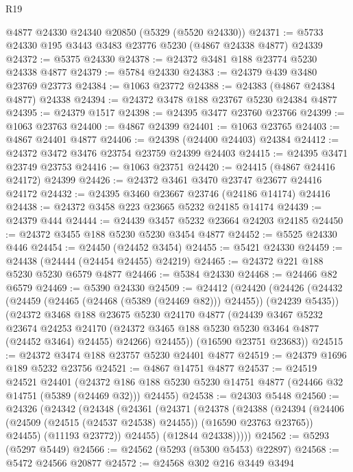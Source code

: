 \begin{lexlean}{R19}
\begin{coremodule}
    @4877
    @24330
    @24340
    @20850
    (@5329 (@5520 @24330))
@24371 := @5733 @24330 @195 @3443 @3483 @23776 @5230 (@4867 @24338 @4877) @24339
@24372 := @5375 @24330
@24378 := @24372 @3481 @188 @23774 @5230 @24338 @4877
@24379 := @5784 @24330
@24383 := @24379 @439 @3480 @23769 @23773
@24384 := @1063 @23772
@24388 := @24383 (@4867 @24384 @4877) @24338
@24394 := @24372 @3478 @188 @23767 @5230 @24384 @4877
@24395 := @24379 @1517
@24398 := @24395 @3477 @23760 @23766
@24399 := @1063 @23763
@24400 := @4867 @24399
@24401 := @1063 @23765
@24403 := @4867 @24401 @4877
@24406 := @24398 (@24400 @24403) @24384
@24412 := @24372 @3472 @3476 @23754 @23759 @24399 @24403
@24415 := @24395 @3471 @23749 @23753
@24416 := @1063 @23751
@24420 := @24415 (@4867 @24416 @24172) @24399
@24426 := @24372 @3461 @3470 @23747 @23677 @24416 @24172
@24432 := @24395 @3460 @23667 @23746 (@24186 @14174) @24416
@24438 := @24372 @3458 @223 @23665 @5232 @24185 @14174
@24439 := @24379 @444
@24444 := @24439 @3457 @5232 @23664 @24203 @24185
@24450 := @24372 @3455 @188 @5230 @5230 @3454 @4877
@24452 := @5525 @24330 @446
@24454 := @24450 (@24452 @3454)
@24455 := @5421 @24330
@24459 := @24438 (@24444 (@24454 @24455) @24219)
@24465 := @24372 @221 @188 @5230 @5230 @6579 @4877
@24466 := @5384 @24330
@24468 := @24466 @82 @6579
@24469 := @5390 @24330
@24509 := @24412
    (@24420
      (@24426
        (@24432 (@24459 (@24465 (@24468 (@5389 (@24469 @82))) @24455)) (@24239 @5435))
        (@24372
          @3468
          @188
          @23675
          @5230
          @24170
          @4877
          (@24439
            @3467
            @5232
            @23674
            @24253
            @24170
            (@24372 @3465 @188 @5230 @5230 @3464 @4877 (@24452 @3464) @24455)
            @24266)
          @24455))
      (@16590 @23751 @23683))
@24515 := @24372 @3474 @188 @23757 @5230 @24401 @4877
@24519 := @24379 @1696 @189 @5232 @23756
@24521 := @4867 @14751 @4877
@24537 := @24519
    @24521
    @24401
    (@24372 @186 @188 @5230 @5230 @14751 @4877 (@24466 @32 @14751 (@5389 (@24469 @32))) @24455)
@24538 := @24303 @5448
@24560 := @24326
    (@24342
      (@24348
        (@24361
          (@24371
            (@24378
              (@24388
                (@24394
                  (@24406 (@24509 (@24515 (@24537 @24538) @24455)) (@16590 @23763 @23765))
                  @24455)
                (@11193 @23772))
              @24455)
            (@12844 @24338)))))
@24562 := @5293 (@5297 @5449)
@24566 := @24562 (@5293 (@5300 @5453) @22897)
@24568 := @5472 @24566 @20877
@24572 := @24568 @302 @216 @3449 @3494

\end{coremodule}
\end{lexlean}
